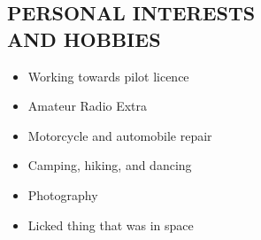 \documentclass[line,mmmargin]{res}
\begin{document}
\begin{resume}

\section{PERSONAL INTERESTS \\ AND HOBBIES}             
				\begin{multicols}{2}
					\begin{itemize}
						\itemsep -2pt
	\item[]Working towards pilot licence
	\item[]Amateur Radio Extra
	\item[]Motorcycle and automobile repair
	\item[]Camping, hiking, and dancing
	\item[]Photography
	\item[]Licked thing that was in space

	\end{itemize}
	\end{multicols}


\end{resume}
\end{document}
